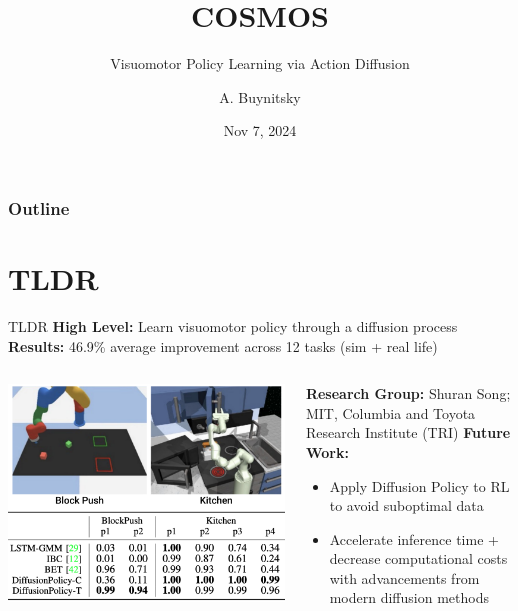 \documentclass{beamer}
\title[World Foundation Model Platform for Physical AI]{COSMOS}
\subtitle{Visuomotor Policy Learning via Action Diffusion} %
\author[MLP]{A. Buynitsky}
\date{Nov 7, 2024}
\begin{document}
\frame{\titlepage}


\begin{frame}
\frametitle{Outline}
\tableofcontents
\end{frame}
\section{TLDR}
\begin{frame}[t]{TLDR}
    \textbf{High Level:} Learn visuomotor policy through a diffusion process \newline
    \textbf{Results:} 46.9\% average improvement across 12 tasks (sim + real life)
    \begin{columns}
		\begin{column}{.5\textwidth}
			\begin{center}
				\includegraphics[width=\textwidth]{./img/dp_results.png}
			\end{center} \pause
		\end{column}
		\hspace{1em}
		\begin{column}{.5\textwidth}
            \textbf{Research Group:} Shuran Song; MIT, Columbia and Toyota Research Institute (TRI)\newline \pause
            \textbf{Future Work:}
            \begin{itemize}[label=-]
                \item Apply Diffusion Policy to RL to avoid suboptimal data
                \item Accelerate inference time + decrease computational costs with advancements from modern diffusion methods
            \end{itemize}
		\end{column}
	\end{columns}
\end{frame}
\end{document}
